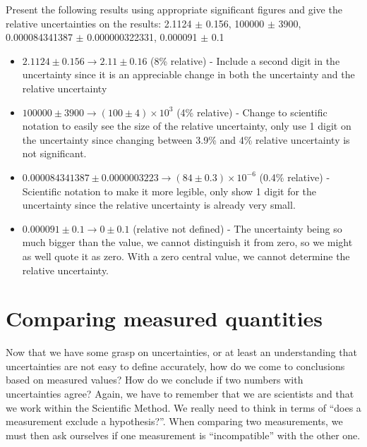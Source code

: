 \begin{example}{0pt}{Present the following results using appropriate significant figures and give the relative uncertainties on the results: 2.1124 $\pm$ 0.156, 100000 $\pm$ 3900, 0.000084341387 $\pm$ 0.000000322331, 0.000091 $\pm$ 0.1}{}
\begin{itemize}
 \item $2.1124 \pm 0.156 \rightarrow 2.11 \pm 0.16$ (8\% relative) - Include a second digit in the uncertainty since it is an appreciable change in both the uncertainty and the relative uncertainty
 \item $100000 \pm 3900 \rightarrow (100 \pm 4)\times 10^3$ (4\% relative) - Change to scientific notation to easily see the size of the relative uncertainty, only use 1 digit on the uncertainty since changing between 3.9\% and 4\% relative uncertainty is not significant.
 \item $0.000084341387 \pm 0.0000003223 \rightarrow (84 \pm 0.3)\times 10^{-6}$ (0.4\% relative) - Scientific notation to make it more legible, only show 1 digit for the uncertainty since the relative uncertainty is already very small.
 \item $0.000091 \pm 0.1 \rightarrow 0 \pm 0.1$ (relative not defined) - The uncertainty being so much bigger than the value, we cannot distinguish it from zero, so we might as well quote it as zero. With a zero central value, we cannot determine the relative uncertainty. 
\end{itemize}

\end{example}

\section{Comparing measured quantities}
Now that we have some grasp on uncertainties, or at least an understanding that uncertainties are not easy to define accurately, how do we come to conclusions based on measured values? How do we conclude if two numbers with uncertainties agree? Again, we have to remember that we are scientists and that we work within the Scientific Method. We really need to think in terms of ``does a measurement exclude a hypothesis?''. When comparing two measurements, we must then ask ourselves if one measurement is ``incompatible'' with the other one.

